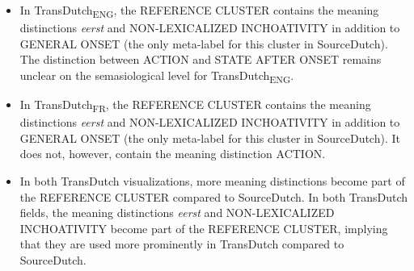 \begin{itemize}
\item  In TransDutch\textsubscript{ENG}, the REFERENCE CLUSTER contains the meaning distinctions \textit{eerst} and {NON-LEXICALIZED INCHOATIVITY} in addition to GENERAL ONSET (the only meta-label for this cluster in SourceDutch). The distinction between ACTION and STATE AFTER ONSET remains unclear on the semasiological level for TransDutch\textsubscript{ENG}.
\item  In TransDutch\textsubscript{FR}, the REFERENCE CLUSTER contains the meaning distinctions \textit{eerst} and {NON-LEXICALIZED INCHOATIVITY} in addition to GENERAL ONSET (the only meta-label for this cluster in SourceDutch). It does not, however, contain the meaning distinction ACTION.
\item  In both TransDutch visualizations, more meaning distinctions become part of the REFERENCE CLUSTER compared to SourceDutch. In both TransDutch fields, the meaning distinctions \textit{eerst} and {NON-LEXICALIZED INCHOATIVITY} become part of the REFERENCE CLUSTER, implying that they are used more prominently in TransDutch compared to SourceDutch.
\end{itemize}

